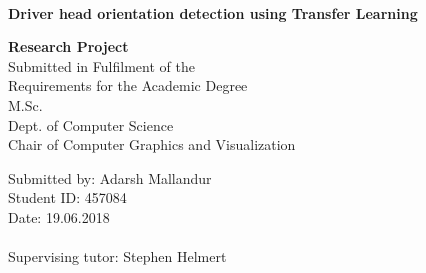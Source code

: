 \documentclass[a4paper, 12pt, oneside, BCOR1cm,toc=chapterentrywithdots]{scrbook}
\begin{document}
%
%

\begin{titlepage}

{
    \begin{center}
        \\
    \end{center}
    \vspace{0.5cm}
}

\begin{center}

\LARGE{\textbf{Driver head orientation detection using Transfer Learning}}\\
\vspace{1cm}


\Large{\textbf{Research Project}}\\ 
\vspace{1cm}
Submitted in Fulfilment of the\\
Requirements for the Academic Degree\\
M.Sc.\\
\vspace{0.5cm}
Dept. of Computer Science\\
Chair of Computer Graphics and Visualization
\end{center}
\vspace{2cm}
Submitted by: Adarsh Mallandur\\
Student ID: 457084\\
Date: 19.06.2018\\
\vspace{0.3cm}\\
Supervising tutor: Stephen Helmert \\

\end{titlepage}
\end{document}
